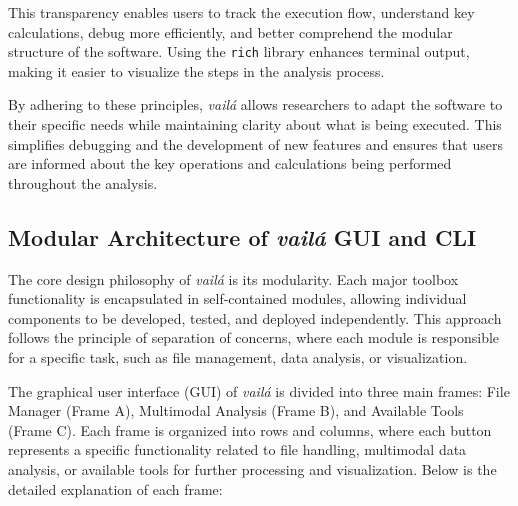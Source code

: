 \documentclass{article}
\begin{document}
This transparency enables users to track the execution flow, understand key calculations, debug more efficiently, and better comprehend the modular structure of the software. Using the \texttt{rich} library enhances terminal output, making it easier to visualize the steps in the analysis process.

By adhering to these principles, \textit{vailá} allows researchers to adapt the software to their specific needs while maintaining clarity about what is being executed. This simplifies debugging and the development of new features and ensures that users are informed about the key operations and calculations being performed throughout the analysis.

\subsection{Modular Architecture of \textit{vailá} GUI and CLI}

The core design philosophy of \textit{vailá} is its modularity. Each major toolbox functionality is encapsulated in self-contained modules, allowing individual components to be developed, tested, and deployed independently. This approach follows the principle of separation of concerns, where each module is responsible for a specific task, such as file management, data analysis, or visualization.

The graphical user interface (GUI) of \textit{vailá} is divided into three main frames: File Manager (Frame A), Multimodal Analysis (Frame B), and Available Tools (Frame C). Each frame is organized into rows and columns, where each button represents a specific functionality related to file handling, multimodal data analysis, or available tools for further processing and visualization. Below is the detailed explanation of each frame:
\end{document}
